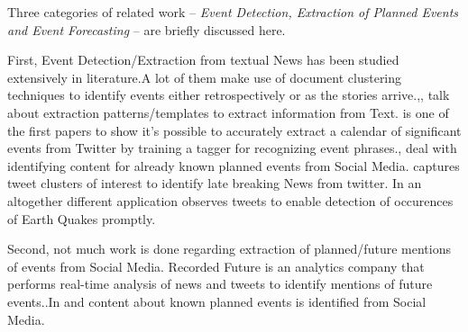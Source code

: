 Three categories of related work -- \emph{Event Detection, Extraction of Planned Events and  Event Forecasting} -- are briefly discussed here.

First, Event Detection/Extraction from textual News has been studied extensively in literature.A lot of them make use of document clustering techniques \cite{Allan:2002:TDT} \cite{Yang:1998:SRO}\cite{Gabrilovich:2004:NPP}to identify events either retrospectively or as the stories arrive.\cite{Chambers:2011:TIE},\cite{Banko07openinformation}, \cite{Riloff:2003:LEP} talk about extraction patterns/templates to extract information from Text. \cite{Ritter:2012} is one of the first papers to show it's possible to accurately extract a calendar of significant events from Twitter by training a tagger for recognizing event phrases.\cite{Becker:2012:ICP}, \cite{Becker_automaticidentification} deal with identifying content for already known planned events from Social Media.\cite{Sankaranarayanan:2009:TNT} captures tweet clusters of interest to identify late breaking News from twitter. In an altogether different application \cite{Sakaki:2010:EST} observes tweets to enable detection of occurences of Earth Quakes promptly.

Second, not much work is done regarding extraction of planned/future mentions of events from Social Media. Recorded Future\cite{recordedFuture} is an analytics company that performs real-time analysis of news and tweets to identify mentions of future events..In \cite{Becker:2012:ICP} and \cite{Becker_automaticidentification} content about known planned events is identified from Social Media.



